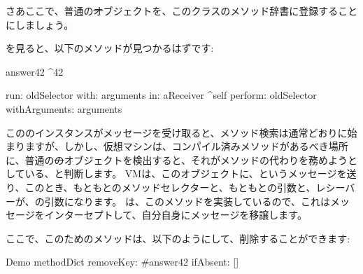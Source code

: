 \documentclass[a4paper,10pt,twoside]{book}
\begin{document}
さあここで、普通の\st オブジェクトを、このクラスのメソッド辞書に登録することにしましょう。

\dothis{\lct{Demo methodDict at: \#answer42 put: ObjectsAsMethodsExample new.}を評価しましょう。
さて、もういちど\ct{Demo new answer42}.の結果をprintしてみましょう。今度は、\ct{42}が得られます。}

を見ると、以下のメソッドが見つかるはずです:
\begin{code}{}
answer42
	^42

run: oldSelector with: arguments in: aReceiver
	^self perform: oldSelector withArguments: arguments
\end{code}

こののインスタンスがメッセージを受け取ると、メソッド検索は通常どおりに始まりますが、しかし、仮想マシンは、コンパイル済みメソッドがあるべき場所に、普通の\st のオブジェクトを検出すると、それがメソッドの代わりを務めようとしている、と判断します。%
VMは、このオブジェクトに、というメッセージを送り、このとき、もともとのメソッドセレクターと、もともとの引数と、レシーバーが、の引数になります。%
は、このメソッドを実装しているので、これはメッセージをインターセプトして、自分自身にメッセージを移譲します。

ここで、このためのメソッドは、以下のようにして、削除することができます:
\begin{code}{}
Demo methodDict removeKey: #answer42 ifAbsent: []
\end{code}
\end{document}
